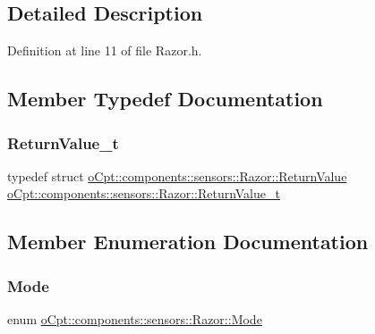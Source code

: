 \subsection{Detailed Description}


Definition at line 11 of file Razor.\+h.



\subsection{Member Typedef Documentation}
\hypertarget{classo_cpt_1_1components_1_1sensors_1_1_razor_aab55c5b1a96ce97421e4696599549954}{}\label{classo_cpt_1_1components_1_1sensors_1_1_razor_aab55c5b1a96ce97421e4696599549954} 
\subsubsection{\texorpdfstring{Return\+Value\+\_\+t}{ReturnValue\_t}}
{\footnotesize\ttfamily typedef struct \hyperlink{structo_cpt_1_1components_1_1sensors_1_1_razor_1_1_return_value}{o\+Cpt\+::components\+::sensors\+::\+Razor\+::\+Return\+Value}  \hyperlink{classo_cpt_1_1components_1_1sensors_1_1_razor_aab55c5b1a96ce97421e4696599549954}{o\+Cpt\+::components\+::sensors\+::\+Razor\+::\+Return\+Value\+\_\+t}}



\subsection{Member Enumeration Documentation}
\hypertarget{classo_cpt_1_1components_1_1sensors_1_1_razor_afed258e485aaaf9193a57d649ccb159b}{}\label{classo_cpt_1_1components_1_1sensors_1_1_razor_afed258e485aaaf9193a57d649ccb159b} 
\subsubsection{\texorpdfstring{Mode}{Mode}}
{\footnotesize\ttfamily enum \hyperlink{classo_cpt_1_1components_1_1sensors_1_1_razor_afed258e485aaaf9193a57d649ccb159b}{o\+Cpt\+::components\+::sensors\+::\+Razor\+::\+Mode}}

